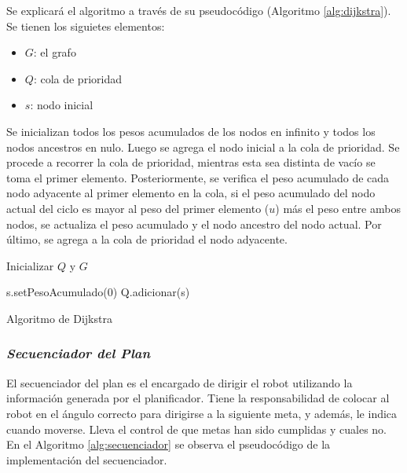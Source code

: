 \documentclass[11pt,twoside,A5]{article}
\newcommand{\refalgorithm}[1]{Algoritmo \ref{#1}}
\begin{document}
\begin{enumerate}
Se explicará el algoritmo a través de su pseudocódigo (Algoritmo \ref{alg:dijkstra}).
Se tienen los siguietes elementos:

\begin{itemize}
\item $G$: el grafo
\item $Q$: cola de prioridad
\item $s$: nodo inicial
\end{itemize}

Se inicializan todos los pesos acumulados de los nodos en infinito y todos los nodos ancestros en nulo. 
Luego se agrega el nodo inicial a la cola de prioridad. 
Se procede a recorrer la cola de prioridad, mientras esta sea distinta de vacío se toma el primer elemento. 
Posteriormente, se verifica el peso acumulado de cada nodo adyacente al primer elemento en la cola, si el peso acumulado del nodo actual del ciclo es mayor
al peso del primer elemento ($u$) más el peso entre ambos nodos, se actualiza el peso acumulado y el nodo ancestro del nodo actual.
Por último, se agrega a la cola de prioridad el nodo adyacente. 

\begin{algorithm}
\DontPrintSemicolon
{}

Inicializar $Q$ y $G$\;


s.setPesoAcumulado(0)\;
Q.adicionar(s)\;


\caption{Algoritmo de Dijkstra \label{alg:dijkstra}}
\end{algorithm}
\end{enumerate}

\subsubsection*{\textit{Secuenciador del Plan}}

El secuenciador del plan es el encargado de dirigir el robot utilizando
la información generada por el planificador. Tiene la responsabilidad de colocar al robot 
en el ángulo correcto para dirigirse a la siguiente meta, y además, le indica cuando moverse.
Lleva el control de que metas han sido cumplidas y cuales no. En el \refalgorithm{alg:secuenciador} se
observa el pseudocódigo de la implementación del secuenciador.
\end{document}
